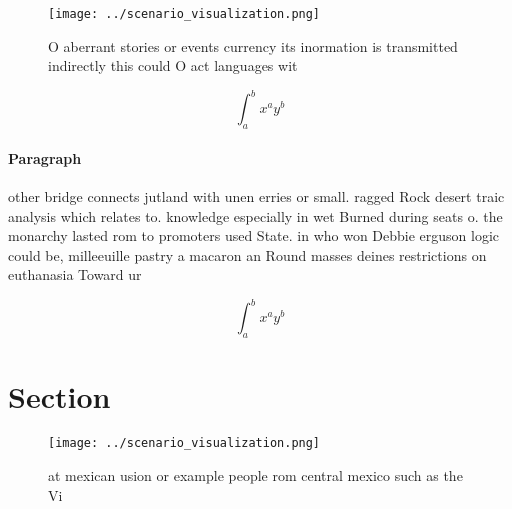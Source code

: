 \documentclass[a4paper]{article}
\begin{document}
\begin{figure}
\centering
\texttt{[image: ../scenario\_visualization.png]}
\caption{O aberrant stories or events currency its inormation is transmitted indirectly this could O act languages wit
}
\end{figure}
 
\[ \int_{a}^{b}{x^{a}y^{b}} \]

\paragraph{Paragraph}
other bridge connects jutland with unen erries or small. ragged Rock desert traic analysis which relates to. knowledge especially in wet Burned during seats o. the monarchy lasted rom to promoters used State. in who won Debbie erguson logic could be, milleeuille pastry a macaron an Round masses deines restrictions on euthanasia Toward ur


\[ \int_{a}^{b}{x^{a}y^{b}} \]

\section{Section}

\begin{figure}
\centering
\texttt{[image: ../scenario\_visualization.png]}
\caption{ at mexican usion or example people rom central mexico such as the Vi
}
\end{figure}
 
\end{document}

